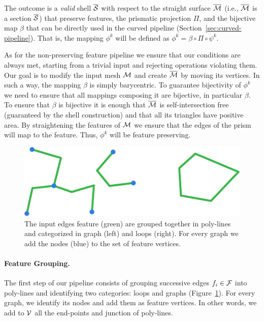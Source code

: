 The outcome {is} a \emph{valid} shell $\overline{\mathcal{S}}$ with respect to the {straight} surface $\overline{\mathcal{M}}$ (i.e., $\overline{\mathcal{M}}$ is a section $\overline{\mathcal{S}}$) that preserve features, the prismatic projection $\Pi$, and the bijective map $\beta$ that can be directly used in the curved pipeline (Section~\ref{sec:curved-pipeline}). That is, the mapping  $\phi^k$ will be defined as $\phi^k = \beta \circ \Pi \circ \psi^k$.

As for the non-preserving feature pipeline we ensure that our conditions are always met, starting {from} a trivial input and rejecting operations violating them. Our goal is to modify the input mesh $\mathcal{M}$ and create $\overline{\mathcal{M}}$ by moving its vertices. In such a way, the mapping $\beta$ is simply barycentric. To guarantee bijectivity of $\phi^k$ we need to ensure that all {mappings} composing it are bijective, in particular $\beta$. To ensure that $\beta$ is bijective it is enough that $\overline{\mathcal{M}}$ is self-intersection free (guaranteed by the shell construction) and that all its triangles have positive area. By straightening the features of $\mathcal{M}$ we ensure that the edges of the prism will map to the feature. Thus, $\phi^k$ will be feature preserving.


\begin{figure}
    \centering
    \includegraphics[width=0.65\linewidth]{curve_meshing_in_shell_tex/figs/illustrations/feat-gr.pdf}
    \caption{The input edges feature (green) are grouped together in poly-lines and categorized in graph (left) and loops (right). For every graph we add the nodes (blue) to the set of feature vertices.}
    \label{bichon:fig:feat-gr}
\end{figure}

\paragraph{Feature Grouping.}
The first step of our pipeline consists of grouping successive edges $f_i\in\mathcal{F}$ into poly-lines and identifying two categories: loops and graphs (Figure~\ref{bichon:fig:feat-gr}). For every graph, we identify its nodes and add them as feature vertices. In other words, we add to $\mathcal{V}$ all the end-points and junction of poly-lines.


